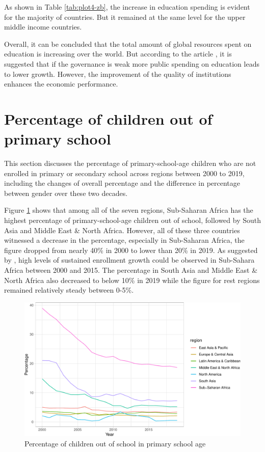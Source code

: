 \documentclass[11pt,a4paper,]{article}
\begin{document}
As shown in Table \ref{tab:plot4-zb}, the increase in education spending is evident for the majority of countries. But it remained at the same level for the upper middle income countries.

Overall, it can be concluded that the total amount of global resources spent on education is increasing over the world. But according to the article \cite{trabelsi2018public}, it is suggested that if the governance is weak more public spending on education leads to lower growth. However, the improvement of the quality of institutions enhances the economic performance.

\section*{Percentage of children out of primary school}

This section discusses the percentage of primary-school-age children who are not enrolled in primary or secondary school across regions between 2000 to 2019, including the changes of overall percentage and the difference in percentage between gender over these two decades.

Figure \ref{fig:plot1xw} shows that among all of the seven regions, Sub-Saharan Africa has the highest percentage of primary-school-age children out of school, followed by South Asia and Middle East \& North Africa. However, all of these three countries witnessed a decrease in the percentage, especially in Sub-Saharan Africa, the figure dropped from nearly 40\% in 2000 to lower than 20\% in 2019. As suggested by \textcite{bennell2002hitting}, high levels of sustained enrollment growth could be observed in Sub-Sahara Africa between 2000 and 2015. The percentage in South Asia and Middle East \& North Africa also decreased to below 10\% in 2019 while the figure for rest regions remained relatively steady between 0-5\%.

\begin{figure}[H]
\includegraphics{report_files/figure-latex/plot1xw-1} \caption{Percentage of children out of school in primary school age}\label{fig:plot1xw}
\end{figure}
\end{document}
